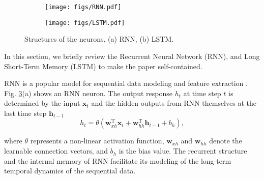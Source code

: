 \documentclass[letterpaper]{article}
\begin{document}
\begin{figure}[t]
	\centering
	\begin{subfigure}[t]{0.25\linewidth}
		\centering\texttt{[image: figs/RNN.pdf]}
		\caption{}
		\label{subfig:RNN}
	\end{subfigure}	
	\begin{subfigure}[t]{0.65\linewidth}
		\centering\texttt{[image: figs/LSTM.pdf]}
		\caption{}			
		\label{subfig:LSTM_unit}
	\end{subfigure}
	\vspace{-3mm}
	\caption[]{Structures of the neurons. (a) RNN,
		(b) LSTM.}\label{fig:RNNLSTM}
	\vspace{1.5mm}
\end{figure}
In this section, we briefly review the Recurrent Neural Network (RNN), and Long Short-Term Memory (LSTM) to make the paper self-contained.

RNN is a popular model for sequential data modeling and feature extraction \cite{Graves2012}. Fig. \ref{fig:RNNLSTM}(a) shows an RNN neuron. The output response ${h}_t$ at time step $t$ is determined by the input $\mathbf{x}_t$ and the hidden outputs from RNN themselves at the last time step $\mathbf{h}_{t-1}$
\begin{equation}
	\label{equ:RNN_ht}
	{h}_t = \theta \left( {\mathbf{w}}^\mathrm{T}_{xh} \mathbf{x}_t + {\mathbf{w}}^\mathrm{T}_{hh} \mathbf{h}_{t-1} + {b}_h \right),
\end{equation}
\begin{comment}
\begin{equation}
\label{equ:RNN_ht}
{h}_t = \theta \left( \mathsfsl{W}_{xh} \mathbf{x}_t + \mathsfsl{W}_{hh} \mathbf{h}_{t-1} + {b}_h \right),
\end{equation}
\end{comment}
where $\theta$ represents a non-linear activation function, $\mathbf{w}_{xh}$ and $\mathbf{w}_{hh}$ denote the learnable connection vectors, and ${b}_h$ is the bias value. The recurrent structure and the internal memory of RNN facilitate its modeling of the long-term temporal dynamics of the sequential data.
\end{document}

